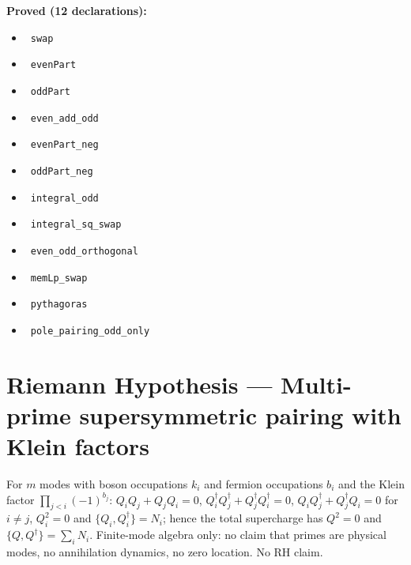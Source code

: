 \documentclass{report}
\theoremstyle{definition}
\begin{document}
\noindent\textbf{Proved (12 declarations):}
\begin{itemize}
  \item {}\leanok\ \texttt{swap}
  \item {}\leanok\ \texttt{evenPart}
  \item {}\leanok\ \texttt{oddPart}
  \item {}\leanok\ \texttt{even\_add\_odd}
  \item {}\leanok\ \texttt{evenPart\_neg}
  \item {}\leanok\ \texttt{oddPart\_neg}
  \item {}\leanok\ \texttt{integral\_odd}
  \item {}\leanok\ \texttt{integral\_sq\_swap}
  \item {}\leanok\ \texttt{even\_odd\_orthogonal}
  \item {}\leanok\ \texttt{memLp\_swap}
  \item {}\leanok\ \texttt{pythagoras}
  \item {}\leanok\ \texttt{pole\_pairing\_odd\_only}
\end{itemize}

\section{Riemann Hypothesis --- Multi-prime supersymmetric pairing with Klein factors}
For $m$ modes with boson occupations $k_i$ and fermion occupations $b_i$ and the Klein factor $\prod_{j<i}(-1)^{b_j}$: $Q_iQ_j+Q_jQ_i=0$, $Q_i^\dagger Q_j^\dagger+Q_j^\dagger Q_i^\dagger=0$, $Q_iQ_j^\dagger+Q_j^\dagger Q_i=0$ for $i\ne j$, $Q_i^2=0$ and $\{Q_i,Q_i^\dagger\}=N_i$; hence the total supercharge has $Q^2=0$ and $\{Q,Q^\dagger\}=\sum_iN_i$. Finite-mode algebra only: no claim that primes are physical modes, no annihilation dynamics, no zero location. No RH claim.
\end{document}
